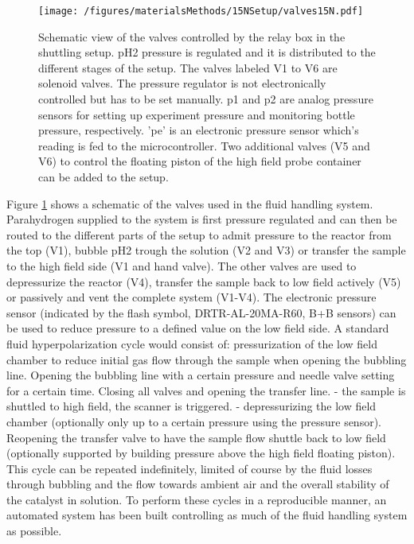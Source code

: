             \begin{figure}
                \texttt{[image: /figures/materialsMethods/15NSetup/valves15N.pdf]}
                \caption[Valve assembly shuttling system]{Schematic view of the valves controlled by the relay box in the shuttling setup. pH2 pressure is regulated and it is distributed to the different stages of the setup. The valves labeled V1 to V6 are solenoid valves. The pressure regulator is not electronically controlled but has to be set manually. p1 and p2 are analog pressure sensors for setting up experiment pressure and monitoring bottle pressure, respectively. 'pe' is an electronic pressure sensor which's reading is fed to the microcontroller. Two additional valves (V5 and V6) to control the floating piston of the high field probe container can be added to the setup.}
                \label{fig:materialsMethods:valveSetup}
            \end{figure}
            Figure \ref{fig:materialsMethods:valveSetup} shows a schematic of the valves used in the fluid handling system. Parahydrogen supplied to the system is first pressure regulated and can then be routed to the different parts of the setup to admit pressure to the reactor from the top (V1), bubble pH2 trough the solution (V2 and V3) or transfer the sample to the high field side (V1 and hand valve). The other valves are used to depressurize the reactor (V4), transfer the sample back to low field actively (V5) or passively  and vent the complete system (V1-V4). The electronic pressure sensor (indicated by the flash symbol, DRTR-AL-20MA-R60, B+B sensors) can be used to reduce pressure to a defined value on the low field side.
            A standard fluid hyperpolarization cycle would consist of: pressurization of the low field chamber to reduce initial gas flow through the sample when opening the bubbling line.  Opening the bubbling line with a certain pressure and needle valve setting for a certain time.  Closing all valves and opening the transfer line. - the sample is shuttled to high field, the scanner is triggered. - depressurizing the low field chamber (optionally only up to a certain pressure using the pressure sensor).  Reopening the transfer valve to have the sample flow shuttle back to low field (optionally supported by building pressure above the high field floating piston).
            This cycle can be repeated indefinitely, limited of course by the fluid losses through bubbling and the flow towards ambient air and the overall stability of the catalyst in solution. 
            To perform these cycles in a reproducible manner, an automated system has been built controlling as much of the fluid handling system as possible.
